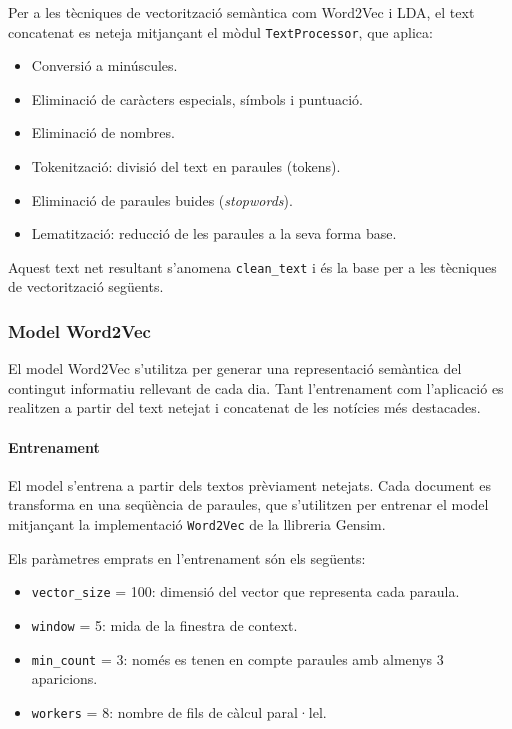 \documentclass[12pt,a4paper,twoside]{book}
\begin{document}
Per a les tècniques de vectorització semàntica com Word2Vec i LDA, el text concatenat es neteja mitjançant el mòdul \texttt{TextProcessor}, que aplica:

\begin{itemize}
    \item Conversió a minúscules.
    \item Eliminació de caràcters especials, símbols i puntuació.
    \item Eliminació de nombres.
    \item Tokenització: divisió del text en paraules (tokens).
    \item Eliminació de paraules buides (\textit{stopwords}).
    \item Lematització: reducció de les paraules a la seva forma base.
\end{itemize}

Aquest text net resultant s'anomena \texttt{clean\_text} i és la base per a les tècniques de vectorització següents.

\subsubsection{Model Word2Vec}

El model Word2Vec s'utilitza per generar una representació semàntica del contingut informatiu rellevant de cada dia. Tant l'entrenament com l'aplicació es realitzen a partir del text netejat i concatenat de les notícies més destacades.

\paragraph{Entrenament}

El model s'entrena a partir dels textos prèviament netejats. Cada document es transforma en una seqüència de paraules, que s'utilitzen per entrenar el model mitjançant la implementació \texttt{Word2Vec} de la llibreria Gensim.

Els paràmetres emprats en l'entrenament són els següents:
\begin{itemize}
    \item \texttt{vector\_size} = 100: dimensió del vector que representa cada paraula.
    \item \texttt{window} = 5: mida de la finestra de context.
    \item \texttt{min\_count} = 3: només es tenen en compte paraules amb almenys 3 aparicions.
    \item \texttt{workers} = 8: nombre de fils de càlcul paral·lel.
\end{itemize}
\end{document}
